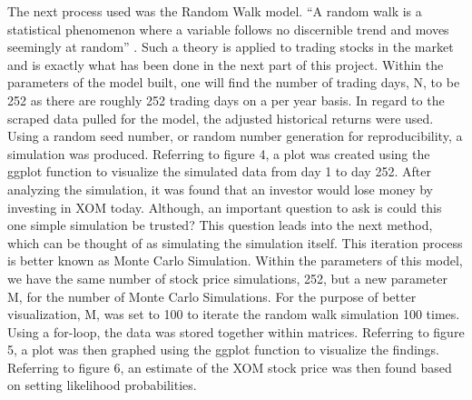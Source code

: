 \documentclass{article}
\begin{document}
The next process used was the Random Walk model. “A random walk is a statistical phenomenon where a variable follows no discernible trend and moves seemingly at random” \cite{CFI}. Such a theory is applied to trading stocks in the market and is exactly what has been done in the next part of this project. Within the parameters of the model built, one will find the number of trading days, N, to be 252 as there are roughly 252 trading days on a per year basis. In regard to the scraped data pulled for the model, the adjusted historical returns were used. Using a random seed number, or random number generation for reproducibility, a simulation was produced. Referring to figure 4, a plot was created using the ggplot function to visualize the simulated data from day 1 to day 252. After analyzing the simulation, it was found that an investor would lose money by investing in XOM today. Although, an important question to ask is could this one simple simulation be trusted? This question leads into the next method, which can be thought of as simulating the simulation itself. This iteration process is better known as Monte Carlo Simulation. Within the parameters of this model, we have the same number of stock price simulations, 252, but a new parameter M, for the number of Monte Carlo Simulations. For the purpose of better visualization, M, was set to 100 to iterate the random walk simulation 100 times. Using a for-loop, the data was stored together within matrices. Referring to figure 5, a plot was then graphed using the ggplot function to visualize the findings. Referring to figure 6, an estimate of the XOM stock price was then found based on setting likelihood probabilities.

\newpage
\end{document}
